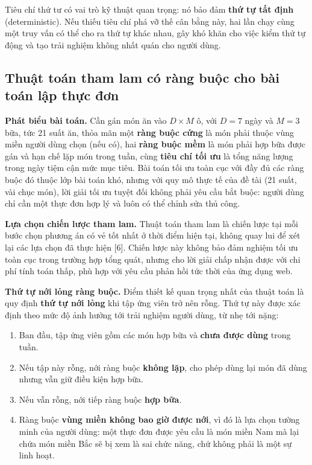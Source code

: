 Tiêu chí thứ tư có vai trò kỹ thuật quan trọng: nó bảo đảm \textbf{thứ tự tất
định} (deterministic). Nếu thiếu tiêu chí phá vỡ thế cân bằng này, hai lần chạy
cùng một truy vấn có thể cho ra thứ tự khác nhau, gây khó khăn cho việc kiểm thử
tự động và tạo trải nghiệm không nhất quán cho người dùng.

\subsection{Thuật toán tham lam có ràng buộc cho bài toán lập thực đơn}
\label{sec:tham-lam}

\textbf{Phát biểu bài toán.} Cần gán món ăn vào $D \times M$ ô, với $D = 7$ ngày
và $M = 3$ bữa, tức 21 suất ăn, thỏa mãn một \textbf{ràng buộc cứng} là món phải
thuộc vùng miền người dùng chọn (nếu có), hai \textbf{ràng buộc mềm} là món phải
hợp bữa được gán và hạn chế lặp món trong tuần, cùng \textbf{tiêu chí tối ưu} là
tổng năng lượng trong ngày tiệm cận mức mục tiêu. Bài toán tối ưu toàn cục với
đầy đủ các ràng buộc đó thuộc lớp bài toán khó, nhưng với quy mô thực tế của đề
tài (21 suất, vài chục món), lời giải tối ưu tuyệt đối không phải yêu cầu bắt
buộc: người dùng chỉ cần một thực đơn hợp lý và luôn có thể chỉnh sửa thủ công.

\textbf{Lựa chọn chiến lược tham lam.} Thuật toán tham lam là chiến lược tại mỗi
bước chọn phương án có vẻ tốt nhất ở thời điểm hiện tại, không quay lui để xét
lại các lựa chọn đã thực hiện [6]. Chiến lược này không bảo đảm nghiệm tối ưu
toàn cục trong trường hợp tổng quát, nhưng cho lời giải chấp nhận được với chi
phí tính toán thấp, phù hợp với yêu cầu phản hồi tức thời của ứng dụng web.

\textbf{Thứ tự nới lỏng ràng buộc.} Điểm thiết kế quan trọng nhất của thuật toán
là quy định \textbf{thứ tự nới lỏng} khi tập ứng viên trở nên rỗng. Thứ tự này
được xác định theo mức độ ảnh hưởng tới trải nghiệm người dùng, từ nhẹ tới nặng:

\begin{enumerate}[label=\arabic*.]
  \item Ban đầu, tập ứng viên gồm các món hợp bữa và \textbf{chưa được dùng}
        trong tuần.
  \item Nếu tập này rỗng, nới ràng buộc \textbf{không lặp}, cho phép dùng lại món
        đã dùng nhưng vẫn giữ điều kiện hợp bữa.
  \item Nếu vẫn rỗng, nới tiếp ràng buộc \textbf{hợp bữa}.
  \item Ràng buộc \textbf{vùng miền không bao giờ được nới}, vì đó là lựa chọn
        tường minh của người dùng: một thực đơn được yêu cầu là món miền Nam mà
        lại chứa món miền Bắc sẽ bị xem là sai chức năng, chứ không phải là một
        sự linh hoạt.
\end{enumerate}

